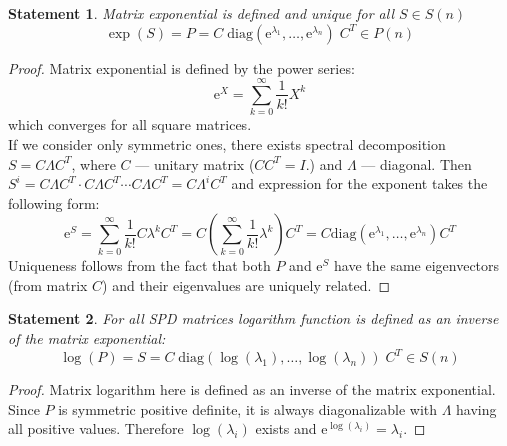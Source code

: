 \documentclass[12pt]{extarticle}
\newtheorem{statement}{Statement}[section]
\theoremstyle{definition}
\theoremstyle{remark}
\begin{document}
	\begin{statement}\label{st:exp}
		Matrix exponential is defined and unique for all $S \in S(n)$
		\begin{equation*}
		\exp(S) = P = C\; \text{diag}(\text{e}^{\lambda_1}, \dots, \text{e}^{\lambda_n} ) \; C^T  \in P(n)
		\end{equation*}
	\end{statement}
	
	\begin{proof}
		Matrix exponential is defined by the power series:
		\begin{equation*}
		\text{e}^{X} = \sum_{k=0}^{\infty}\frac{1}{k!}X^k
		\end{equation*} 
		which converges for all square matrices. \\
		If we consider only symmetric ones, there exists spectral decomposition $S = C \Lambda C^T$, where $C$ --- unitary matrix ($CC^T = I$.) and $\Lambda$ --- diagonal. Then 
		$
		S^i =C \Lambda C^T\cdot C \Lambda C^T \cdots C \Lambda C^T = C \Lambda^i C^T 
		$
		and expression for the exponent takes the following form:
		\begin{equation*}
		\text{e}^{S} = \sum_{k=0}^{\infty}\frac{1}{k!}C\lambda^kC^T = C\left(\sum_{k=0}^{\infty}\frac{1}{k!}\lambda^k\right)C^T = C\text{diag}(\text{e}^{\lambda_1}, \dots, \text{e}^{\lambda_n})C^T
		\end{equation*}
		Uniqueness follows from the fact that both $P$ and  $\text{e}^S$ have the same eigenvectors (from matrix $C$) and their eigenvalues are uniquely related. 
	\end{proof}
	
	\begin{statement}\label{st:log}
		For all SPD matrices logarithm function is defined as an inverse of the matrix exponential:
		\begin{equation*}
		\log(P) = S = C\; \text{diag}(\log(\lambda_1), \dots, \log(\lambda_n) ) \; C^T \in S(n)
		\end{equation*}    
	\end{statement}    
	
	\begin{proof}
		Matrix logarithm here is defined as an inverse of the matrix exponential. Since $P$ is symmetric positive definite, it is always diagonalizable with $\Lambda$ having all positive values. Therefore $\log (\lambda_i)$ exists and $\text{e}^{\log (\lambda_i)} = \lambda_i$.
	\end{proof}
	
\end{document}
